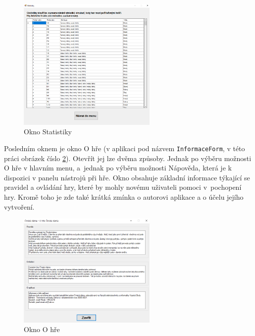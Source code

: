 \begin{figure}
	\centering
	\includegraphics[width=0.6\textwidth]{Figures/Statistiky.png}
	\caption{Okno \textsf{Statistiky}}
    \label{fig:Statistiky}
\end{figure}

Posledním oknem je okno \textsf{O hře} (v aplikaci pod názvem \lstinline$InformaceForm$, v této práci obrázek číslo \ref{fig:OHre}). Otevřít jej lze dvěma způsoby. Jednak po výběru možnosti \textsf{O hře} v hlavním menu, a~jednak po výběru možnosti \textsf{Nápověda}, která je k dispozici v panelu nástrojů při hře. Okno obsahuje základní informace týkající se pravidel a ovládání hry, které by mohly novému uživateli pomoci v~pochopení hry. Kromě toho je zde také krátká zmínka o autorovi aplikace a o účelu jejího vytvoření.

\begin{figure}
	\centering
	\includegraphics[width=0.6\textwidth]{Figures/OHre.png}
	\caption{Okno \textsf{O hře}}
    \label{fig:OHre}
\end{figure}
\endinput